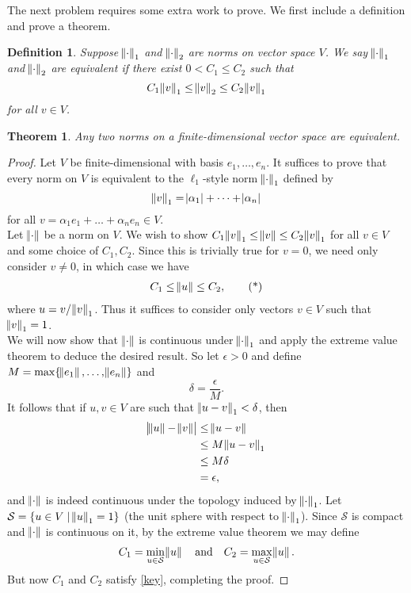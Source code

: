 \documentclass{extarticle}
\newtheorem*{thm-non}{Theorem}
\newtheorem*{definition}{Definition}
\begin{document}
The next problem requires some extra work to prove.  We first include a definition and prove a theorem.
\begin{definition}
Suppose $\norm{\cdot}_1$ and $\norm{\cdot}_2$ are norms on vector space $V$.  We say $\norm{\cdot}_1$ and $\norm{\cdot}_2$ are \emph{equivalent} if there exist $0 < C_1\leq C_2$ such that 
\begin{equation*}
C_1 \norm{v}_1 \leq \norm{v}_2 \leq C_2 \norm{v}_1
\end{equation*}
for all $v\in V$.
\end{definition}
\begin{thm-non}
Any two norms on a finite-dimensional vector space are equivalent.
\end{thm-non}
\begin{proof}
Let $V$ be finite-dimensional with basis $e_1,\dots, e_n$.  It suffices to prove that every norm on $V$ is equivalent to the $\ell_1$-style norm $\norm{\cdot}_1$ defined by
\begin{equation*}
\norm{v}_1 = \abs{\alpha_1} + \dots + \abs{\alpha_n}
\end{equation*}
for all $v = \alpha_1e_1 + \dots + \alpha_ne_n\in V$.\\
\indent Let $\norm{\cdot}$ be a norm on $V$.  We wish to show $C_1\norm{v}_1 \leq \norm{v}\leq C_2\norm{v}_1$ for all $v\in V$ and some choice of $C_1,C_2$.  Since this is trivially true for $v = 0$, we need only consider $v\neq 0$, in which case we have
\begin{align*}
C_1 \leq \norm{u} \leq C_2, \tag{*}\label{key}
\end{align*}
where $u = v/\norm{v}_1$.  Thus it suffices to consider only vectors $v\in V$ such that $\norm{v}_1 = 1$.\\
\indent We will now show that $\norm{\cdot}$ is continuous under $\norm{\cdot}_1$ and apply the extreme value theorem to deduce the desired result.  So let $\epsilon > 0$ and define $M = \max\{\norm{e_1}, \dots, \norm{e_n}\}$ and
\begin{equation*}
\delta = \frac{\epsilon}{M}.
\end{equation*}
It follows that if $u,v\in V$ are such that $\norm{u - v}_1 < \delta$, then
\begin{align*}
\abs{\norm{u} - \norm{v}} &\leq \norm{u - v}\\
&\leq M\norm{u - v}_1\\
&\leq M\delta \\
&= \epsilon,
\end{align*}
and $\norm{\cdot}$ is indeed continuous under the topology induced by $\norm{\cdot}_1$.  Let $\mathcal{S} = \{u\in V\mid \norm{u}_1=1\}$ (the unit sphere with respect to $\norm{\cdot}_1$).  Since $\mathcal{S}$ is compact and $\norm{\cdot}$ is continuous on it, by the extreme value theorem we may define
\begin{align*}
C_1 = \min_{u \in \mathcal{S}}\norm{u}~~~\text{and}~~~C_2 =  \max_{u \in \mathcal{S}}\norm{u}.
\end{align*}
But now $C_1$ and $C_2$ satisfy \eqref{key}, completing the proof.
\end{proof}
\end{document}
